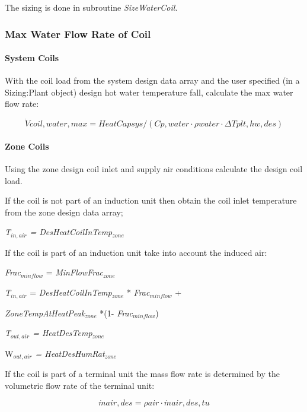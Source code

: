 The sizing is done in subroutine \emph{SizeWaterCoil}.

\subsubsection{Max Water Flow Rate of Coil}\label{max-water-flow-rate-of-coil-1}

\paragraph{System Coils}\label{system-coils}

With the coil load from the system design data array and the user specified (in a Sizing:Plant object) design hot water temperature fall, calculate the max water flow rate:

\begin{equation}
\dot Vcoil,water,max = HeatCapsys/(Cp,water\cdot \rho water\cdot \Delta Tplt,hw,des)
\end{equation}

\paragraph{Zone Coils}\label{zone-coils}

Using the zone design coil inlet and supply air conditions calculate the design coil load.

If the coil is not part of an induction unit then obtain the coil inlet temperature from the zone design data array;

\emph{T\(_{in,air}\) = DesHeatCoilInTemp\(_{zone}\)}

If the coil is part of an induction unit take into account the induced air:

\emph{Frac\(_{minflow}\)} = \emph{MinFlowFrac\(_{zone}\)}

\emph{T\(_{in,air}\)} = \emph{DesHeatCoilInTemp\(_{zone}\)} * \emph{Frac\(_{minflow}\)} +

\emph{ZoneTempAtHeatPeak\(_{zone}\)} *(1- \emph{Frac\(_{minflow}\)})

\emph{T\(_{out,air}\) = HeatDesTemp\(_{zone}\)}

W\emph{\(_{out,air}\) = HeatDesHumRat\(_{zone}\)}

If the coil is part of a terminal unit the mass flow rate is determined by the volumetric flow rate of the terminal unit:

\begin{equation}
\dot mair,des = \rho air\cdot \dot mair,des,tu
\end{equation}

